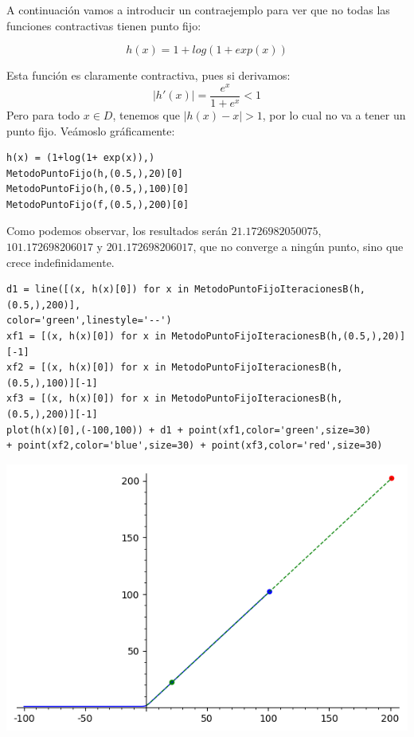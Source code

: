 A continuación vamos a introducir un contraejemplo para ver que no todas las funciones contractivas tienen punto fijo:

\begin{example}
$$h(x) = 1+log(1+ exp(x)) $$

Esta función es claramente contractiva, pues si derivamos:
$$|h'(x)| = \frac{e^{x}}{1+e^{x}} < 1$$
Pero para todo $x \in D$, tenemos que $|h(x)-x| > 1$, por lo cual no va a tener un punto fijo. Veámoslo gráficamente:
\begin{verbatim}
h(x) = (1+log(1+ exp(x)),)
MetodoPuntoFijo(h,(0.5,),20)[0]
MetodoPuntoFijo(h,(0.5,),100)[0]
MetodoPuntoFijo(f,(0.5,),200)[0]
\end{verbatim}

Como podemos observar, los resultados serán $21.1726982050075$, $101.172698206017$ y $201.172698206017$, que no converge a ningún punto, sino que crece indefinidamente.

\begin{verbatim}
d1 = line([(x, h(x)[0]) for x in MetodoPuntoFijoIteracionesB(h,(0.5,),200)],
color='green',linestyle='--')
xf1 = [(x, h(x)[0]) for x in MetodoPuntoFijoIteracionesB(h,(0.5,),20)][-1]
xf2 = [(x, h(x)[0]) for x in MetodoPuntoFijoIteracionesB(h,(0.5,),100)][-1]
xf3 = [(x, h(x)[0]) for x in MetodoPuntoFijoIteracionesB(h,(0.5,),200)][-1]
plot(h(x)[0],(-100,100)) + d1 + point(xf1,color='green',size=30) 
+ point(xf2,color='blue',size=30) + point(xf3,color='red',size=30)
\end{verbatim}

\includegraphics[scale=1]{MetodoPuntoFijoNoConverge}


\end{example}

